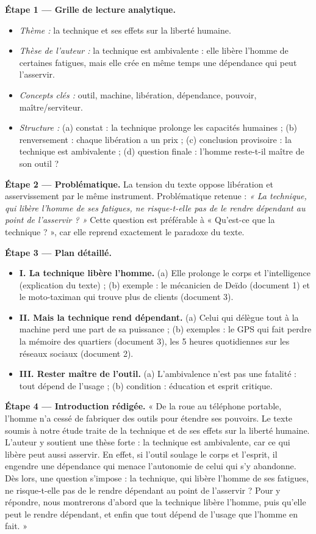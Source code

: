 \documentclass[11pt]{article}
\newcommand{\cle}[1]{{\popxbold\color{popdark}#1}}
\begin{document}
\begin{exoresolu}
\textbf{Étape 1 — Grille de lecture analytique.}
\begin{itemize}
\item \emph{Thème :} la technique et ses effets sur la liberté humaine.
\item \emph{Thèse de l'auteur :} la technique est \cle{ambivalente} : elle libère l'homme de certaines fatigues, mais elle crée en même temps une dépendance qui peut l'asservir.
\item \emph{Concepts clés :} outil, machine, libération, dépendance, pouvoir, maître/serviteur.
\item \emph{Structure :} (a) constat : la technique prolonge les capacités humaines ; (b) renversement : chaque libération a un prix ; (c) conclusion provisoire : la technique est ambivalente ; (d) question finale : l'homme reste-t-il maître de son outil ?
\end{itemize}

\textbf{Étape 2 — Problématique.} La tension du texte oppose libération et asservissement par le même instrument. Problématique retenue : \emph{« La technique, qui libère l'homme de ses fatigues, ne risque-t-elle pas de le rendre dépendant au point de l'asservir ? »} Cette question est préférable à « Qu'est-ce que la technique ? », car elle reprend exactement le paradoxe du texte.

\textbf{Étape 3 — Plan détaillé.}
\begin{itemize}
\item \textbf{I. La technique libère l'homme.} (a) Elle prolonge le corps et l'intelligence (explication du texte) ; (b) exemple : le mécanicien de Deïdo (document 1) et le moto-taximan qui trouve plus de clients (document 3).
\item \textbf{II. Mais la technique rend dépendant.} (a) Celui qui délègue tout à la machine perd une part de sa puissance ; (b) exemples : le GPS qui fait perdre la mémoire des quartiers (document 3), les 5 heures quotidiennes sur les réseaux sociaux (document 2).
\item \textbf{III. Rester maître de l'outil.} (a) L'ambivalence n'est pas une fatalité : tout dépend de l'usage ; (b) condition : éducation et esprit critique.
\end{itemize}

\textbf{Étape 4 — Introduction rédigée.} « De la roue au téléphone portable, l'homme n'a cessé de fabriquer des outils pour étendre ses pouvoirs. Le texte soumis à notre étude traite de la technique et de ses effets sur la liberté humaine. L'auteur y soutient une thèse forte : la technique est ambivalente, car ce qui libère peut aussi asservir. En effet, si l'outil soulage le corps et l'esprit, il engendre une dépendance qui menace l'autonomie de celui qui s'y abandonne. Dès lors, une question s'impose : la technique, qui libère l'homme de ses fatigues, ne risque-t-elle pas de le rendre dépendant au point de l'asservir ? Pour y répondre, nous montrerons d'abord que la technique libère l'homme, puis qu'elle peut le rendre dépendant, et enfin que tout dépend de l'usage que l'homme en fait. »


\end{exoresolu}
\end{document}
